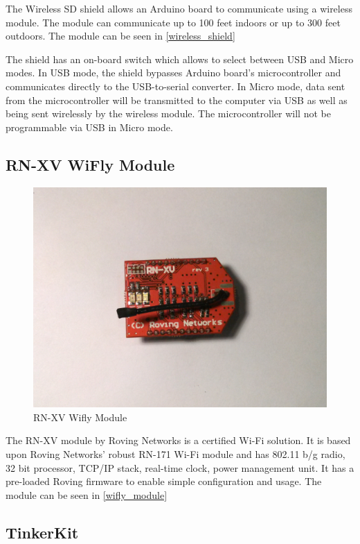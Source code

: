 The Wireless SD shield \cite{arduino_wireless} allows an Arduino board to communicate using a wireless module. The module can communicate up to 100 feet indoors or up to 300 feet outdoors. The module can be seen in \autoref{wireless_shield} 

The shield has an on-board switch which allows to select between USB and Micro modes. In USB mode, the shield bypasses Arduino board's microcontroller and communicates directly to the USB-to-serial converter. In Micro mode, data sent from the microcontroller will be transmitted to the computer via USB as well as being sent wirelessly by the wireless module. The microcontroller will not be programmable via USB in Micro mode.

\subsection{RN-XV WiFly Module}

\begin{figure}[h!]
\centering
\includegraphics[scale=0.58]{2/figures/wifly.pdf}
\caption{RN-XV Wifly Module}
\label{wifly_module}
\end{figure}	

The RN-XV module \cite{rn_xv_module} by Roving Networks is a certified Wi-Fi solution. It is based upon Roving Networks' robust RN-171 Wi-Fi module and has 802.11 b/g radio, 32 bit processor, TCP/IP stack, real-time clock, power management unit. It has a pre-loaded Roving firmware to enable simple configuration and usage. The module can be seen in \autoref{wifly_module}

\subsection{TinkerKit}

